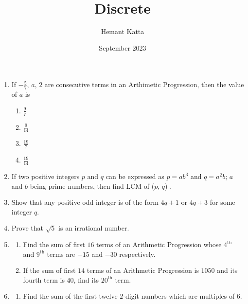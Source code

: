 \documentclass{article}
\title{Discrete}
\author{Hemant Katta}
\date{September 2023}
\begin{document}
\maketitle

\begin{enumerate}
    \item If $-\frac{5}{7}$, $a$, $2$ are consecutive terms in an Arthimetic Progression, then the value of $a$ is 
    \begin{enumerate}
        \item $\frac{9}{7}$
         \item $\frac{9}{14}$
          \item $\frac{19}{7}$
           \item $\frac{19}{14}$
    \end{enumerate}
    \item If two positive integers $p$ and $q$ can be expressed as $p = ab^3$ and $q = a^2b$; 
$a$ and $b$ being prime numbers, then find LCM of ($p$, $q$) . 

    \item Show that any positive odd integer is of the form $4q + 1$ or $4q + 3$ for some integer $q$. 
    \item Prove that $\sqrt{5}$ is an irrational number.
    \item
    \begin{enumerate}
    \item Find the sum of first $16$ terms of an Arithmetic Progression whose $4^{\text{th}}$ and $9^{\text{th}}$ terms are $-15$ and $-30$ respectively.
    
        \item If the sum of first $14$ terms of an Arithmetic Progression is $1050$ and its fourth term is $40$, find its $20^{\text{th}}$ term.
    \end{enumerate}

    \item 
    \begin{enumerate}
        \item Find the sum of the first twelve $2$-digit numbers which are 
multiples of $6$.


\end{enumerate}
\end{enumerate}
\end{document}
